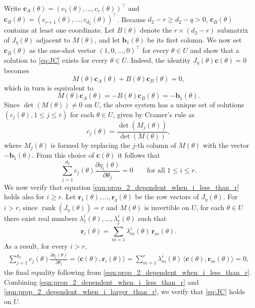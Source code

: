 \documentclass[11pt,twoside]{article} %
\begin{document}
Write $\mathbf c_A(\theta) = (c_1(\theta), \dots, c_r(\theta))^\top$ and
$\mathbf c_B(\theta) = (c_{r+1}(\theta), \dots, c_{d_2}(\theta))^\top$. Because
$d_2 - r \ge d_2 - q > 0$,  $\mathbf c_B(\theta)$ contains at least one coordinate. Let $B(\theta)$
denote the $r \times (d_2 - r)$ submatrix of $J_\eta(\theta)$ adjacent to $M(\theta)$, and let $\mathbf b_1(\theta)$
be its first column.
We now set $\mathbf c_B(\theta)$ as the one-shot vector $(1, 0, \dots, 0)^\top$ for every $\theta \in U$ and show that a solution to \eqref{eq:JC} exists for every $\theta \in U$. Indeed, the identity $J_\eta(\theta)\mathbf c(\theta) = 0$ becomes
$$ M(\theta)\mathbf c_A(\theta) + B(\theta)\mathbf c_B(\theta) = 0, $$
which in turn is equivalent to
$$ M(\theta)\mathbf c_A(\theta) = -B(\theta)\mathbf c_B(\theta) = -\mathbf b_1(\theta). $$
Since $\det(M(\theta)) \ne 0$ on $U$, the above system has a unique set of solutions  $(c_j(\theta), 1 \le j \le r)$ for each $\theta \in U$, given by Cramer's rule as
$$ c_j(\theta) = \frac{\det(M_j(\theta))}{\det(M(\theta))}, $$
where $M_j(\theta)$ is formed by replacing the $j$-th column of $M(\theta)$ with the vector
$-\mathbf b_1(\theta)$. From this choice of $\mathbf c(\theta)$ it follows that
\begin{equation}
\label{eqn:prop_2_dependent_when_i_less_than_r}
    \sum_{j=1}^{d_2} c_j(\theta)\frac{\partial \eta_i(\theta)}{\partial \theta_j} = 0
    \qquad \text{for all } 1 \le i \le r.
\end{equation}
We now verify that equation \eqref{eqn:prop_2_dependent_when_i_less_than_r} holds also for $i\geq r$. Let $\mathbf r_1(\theta), \dots, \mathbf r_q(\theta)$ be the row vectors of $J_\eta(\theta)$. For $i > r$, since $\operatorname{rank}(J_\eta(\theta)) = r$ and $M(\theta)$ is invertible on $U$, for each $\theta \in U$
there exist real numbers $\lambda^i_1(\theta), \dots, \lambda^i_r(\theta)$ such that
\begin{equation*}
    \mathbf r_i(\theta) = \sum_{m=1}^{r} \lambda^i_m(\theta)\,\mathbf r_m(\theta).
\end{equation*}
As a result, for every $i > r$,
\begin{align}
\label{eqn:prop_2_dependent_when_i_larger_than_r}
    \sum_{j=1}^{d_2} c_j(\theta)\frac{\partial \eta_i(\theta)}{\partial \theta_j}
    = \langle \mathbf c(\theta), \mathbf r_i(\theta)\rangle
    = \sum_{m=1}^{r} \lambda^i_m(\theta)\,\langle \mathbf c(\theta), \mathbf r_m(\theta)\rangle = 0,
\end{align}
the final equality following from \eqref{eqn:prop_2_dependent_when_i_less_than_r}. Combining
\eqref{eqn:prop_2_dependent_when_i_less_than_r} and \eqref{eqn:prop_2_dependent_when_i_larger_than_r}, we
verify that \eqref{eq:JC} holds on $U$.
\end{document}
